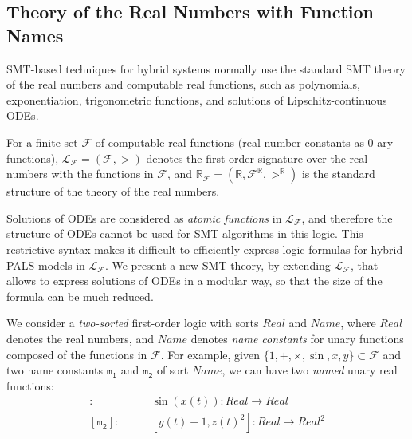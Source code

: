 %


\subsection{Theory of the Real Numbers with Function Names}

SMT-based techniques for hybrid systems
normally use the standard SMT theory of the real numbers and computable %
real functions,
such as polynomials, exponentiation, trigonometric functions,  
and solutions of Lipschitz-continuous ODEs.

\begin{definition}
For a finite set $\mathcal{F}$ of computable real functions
(real number constants as $0$-ary functions),
%
$\mathcal{L}_\mathcal{F} = (\mathcal{F}, >)$ denotes the first-order signature over the real numbers
with the functions in $\mathcal{F}$,
and $\mathbb{R}_\mathcal{F} = (\mathbb{R}, \mathcal{F}^\mathbb{R}, >^\mathbb{R})$
is the standard structure of the theory of the real numbers.
\end{definition}


Solutions of ODEs are considered as \emph{atomic functions} in $\mathcal{L}_\mathcal{F}$,
and therefore the structure of ODEs cannot be used for SMT algorithms  in this logic.
This restrictive syntax makes it difficult to efficiently express logic formulas for hybrid PALS models 
in $\mathcal{L}_\mathcal{F}$. 
We present a new SMT theory,
by extending $\mathcal{L}_\mathcal{F}$, that allows to express solutions of ODEs in a modular way,
so that the size of the formula can be much reduced.


We consider a \emph{two-sorted} first-order logic with sorts $\mathit{Real}$ and $\mathit{Name}$,
where $\mathit{Real}$ denotes the real numbers,
and $\mathit{Name}$ denotes \emph{name constants} 
for unary functions composed of the functions in $\mathcal{F}$.
For example, given $\{1, +, \times, \sin, x, y\} \subset \mathcal{F}$
and two name constants $\mathtt{m_1}$ and $\mathtt{m_2}$ of sort $\mathit{Name}$,
we can have two \emph{named} unary real functions:
\begin{align*}
[\mathtt{m_1}]:\qquad&
\sin(x(t)) :\mathit{Real} \to \mathit{Real}
\\
[\mathtt{m_2}]:\qquad&
[y(t) + 1, z(t)^2] :  \mathit{Real} \to \mathit{Real}^2
\end{align*}


